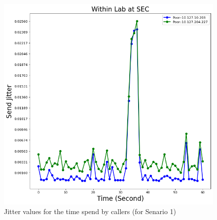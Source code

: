 	\begin{figure}[!t]
		\begin{minipage}{\textwidth}
			\includegraphics[scale=0.38]{Images/experiment/senarios/df_in_lab.png}
		\end{minipage}
		\caption{Jitter values for the time spend by callers (for Senario 1)}
		\label{fig:scene-out-1}
	\end{figure}


